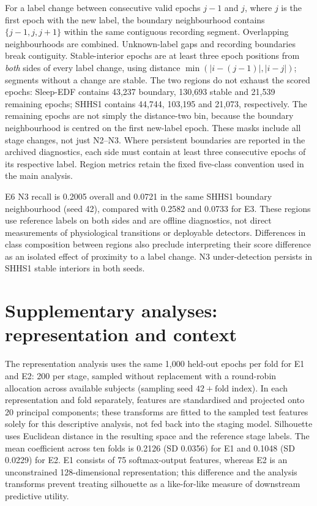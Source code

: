 \documentclass[10pt,a4paper]{article}
\begin{document}
For a label change between consecutive valid epochs $j-1$ and $j$, where $j$ is the first epoch
with the new label, the boundary neighbourhood contains $\{j-1,j,j+1\}$ within the same contiguous
recording segment. Overlapping neighbourhoods are combined. Unknown-label gaps and recording
boundaries break contiguity. Stable-interior epochs are at least three epoch positions from
\emph{both} sides of every label change, using distance
$\min(|i-(j-1)|,|i-j|)$; segments without a change are stable. The two regions do not exhaust the
scored epochs: Sleep-EDF contains 43,237 boundary, 130,693 stable and 21,539 remaining epochs;
SHHS1 contains 44,744, 103,195 and 21,073, respectively. The remaining epochs are not simply the
distance-two bin, because the boundary neighbourhood is centred on the first new-label epoch.
These masks include all stage changes, not just N2--N3. Where persistent boundaries are reported
in the archived diagnostics, each side must contain at least three consecutive epochs of its
respective label. Region metrics retain the fixed five-class convention used in the main analysis.

E6 N3 recall is 0.2005 overall and 0.0721 in the same SHHS1 boundary neighbourhood (seed 42), compared with
0.2582 and 0.0733 for E3. These regions use reference labels on both sides and are offline diagnostics,
not direct measurements of physiological transitions or deployable detectors. Differences in class
composition between regions also preclude interpreting their score difference as an isolated effect
of proximity to a label change. N3 under-detection persists in SHHS1 stable interiors in both seeds.

\section*{Supplementary analyses: representation and context}

The representation analysis uses the same 1,000 held-out epochs per fold for E1 and E2: 200 per
stage, sampled without replacement with a round-robin allocation across available subjects
(sampling seed $42+\text{fold index}$). In each representation and fold separately, features are
standardised and projected onto 20 principal components; these transforms are fitted to the
sampled test features solely for this descriptive analysis, not fed back into the staging model.
Silhouette uses Euclidean distance in the resulting space and the reference stage labels. The
mean coefficient across ten folds is 0.2126 (SD 0.0356) for E1 and 0.1048 (SD 0.0229) for E2.
E1 consists of 75 softmax-output features, whereas E2 is an unconstrained 128-dimensional
representation; this difference and the analysis transforms prevent treating silhouette as a
like-for-like measure of downstream predictive utility.
\end{document}
